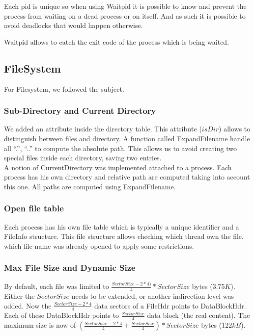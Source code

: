 Each pid is unique so when using Waitpid it is possible to know and prevent the
process from waiting on a dead process or on itself. And as such it is possible
to avoid deadlocks that would happen otherwise.

Waitpid allows to catch the exit code of the process which is being waited.

\subsection{FileSystem}
For Filesystem, we followed the subject.

\subsubsection{Sub-Directory and Current Directory}

We added an attribute inside the directory table. This attribute ($isDir$) allows
to distinguish between files and directory. A function called
\textrm{ExpandFilename} handle all ``.'', ``..'' to compute the absolute
path. This allows us to avoid creating two special files inside each directory,
saving two entries.\\

A notion of CurrentDirectory was implemented attached to a process. Each process
has his own directory and relative path are computed taking into account this
one. All paths are computed using ExpandFilename.

\subsubsection{Open file table}
Each process has his own file table which is typically a unique identifier and a
FileInfo structure. This file structure allows checking which thread own the
file, which file name was already opened to apply some restrictions.

\subsubsection{Max File Size and Dynamic Size}
By default, each file was limited to $\frac{SectorSize - 2*4)}{4} * SectorSize$
bytes ($3.75K$). Either the $SectorSize$ needs to be extended, or another
indirection level was added.
Now the $\frac{SectorSize - 2*4}{4}$ data sectors of a FileHdr points to
DataBlockHdr. Each of these DataBlockHdr points to $\frac{SectorSize}{4}$ data
block (the real content).
The maximum size is now of $(\frac{SectorSize - 2*4}{4} +
\frac{SectorSize}{4})*SectorSize$ bytes ($122kB$).\\

